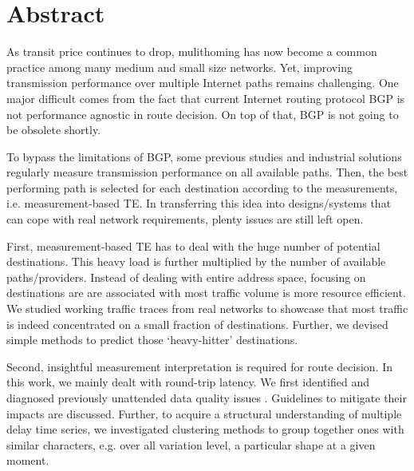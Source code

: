 \begingroup
\let\clearpage\relax
\let\cleardoublepage\relax
\let\cleardoublepage\relax

\chapter*{Abstract}

As transit price continues to drop, mulithoming has now become a common practice among many medium and small size networks. Yet, improving transmission performance over multiple Internet paths remains challenging.
One major difficult comes from the fact that current Internet routing protocol \acf{BGP} is not performance agnostic in route decision. 
On top of that, \ac{BGP} is not going to be obsolete shortly.

To bypass the limitations of \ac{BGP}, some previous studies and industrial solutions regularly measure transmission performance on all available paths.
Then, the best performing path is selected for each destination according to the measurements, i.e. measurement-based \acf{TE}.
In transferring this idea into designs/systems that can cope with real network requirements, plenty issues are still left open.

First, measurement-based TE has to deal with the huge number of potential destinations.
This heavy load is further multiplied by the number of available paths/providers.
Instead of dealing with entire address space, focusing on destinations are are associated with most traffic volume is more resource efficient.
We studied working traffic traces from real networks to showcase that most traffic is indeed concentrated on a small fraction of destinations.
Further, we devised simple methods to predict those `heavy-hitter' destinations.

Second, insightful measurement interpretation is required for route decision.
In this work, we mainly dealt with round-trip latency.
We first identified and diagnosed previously unattended data quality issues .
Guidelines to mitigate their impacts are discussed.
Further, to acquire a structural understanding of multiple delay time series, we investigated clustering methods to group together ones with similar characters, e.g. over all variation level, a particular shape at a given moment.


